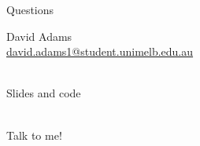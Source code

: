 \documentclass[aspectratio=169, 10pt]{beamer}
\begin{document}
\begin{frame}[standout]
  \Large Questions

  \vspace{1.2em}
  \normalsize
  David Adams\\
  \href{mailto:david.adams1@student.unimelb.edu.au}{david.adams1@student.unimelb.edu.au}

  \vspace{1.1em}
  \begin{minipage}{0.52\textwidth}
    \centering
    \begin{minipage}[t]{0.48\textwidth}
      \centering
      \\[0.35em]
      \small Slides and code
    \end{minipage}
    \hfill
    \begin{minipage}[t]{0.48\textwidth}
      \centering
      \\[0.35em]
      \small Talk to me!
    \end{minipage}
  \end{minipage}
\end{frame}



\end{document}
